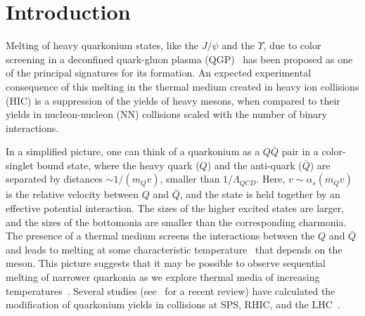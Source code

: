 \documentclass[article,showpacs,preprintnumbers,amsmath,amssymb]{revtex4}
\newcommand{\barQ}{{\bar{Q}}}
\begin{document}
\maketitle
\section{Introduction~\label{section:Introduction}}
Melting of heavy quarkonium states, like the $J/\psi$ and the
$\Upsilon$, due to color screening in a deconfined quark-gluon plasma 
(QGP)~\cite{Matsui:1986} has been proposed as one of the principal 
signatures for its  formation. An expected experimental consequence of this 
melting  in the thermal medium created in heavy ion collisions (HIC) is a
suppression of the yields of heavy mesons, when compared to their yields in
nucleon-nucleon (NN) collisions scaled with the number of binary 
interactions.  

In a simplified picture, one can think of a quarkonium as a $Q\barQ$ pair
in a color-singlet bound state, where the heavy quark ($Q$) and the
anti-quark ($\bar{Q}$) are separated by distances $\sim 1/(m_Qv)$,
smaller than $1/\Lambda_{QCD}$. Here, $v\sim \alpha_s(m_Q v)$ is the relative
velocity between $Q$ and $\barQ$, and the state is held together by an
effective potential interaction. The sizes of the higher excited states are
larger, and the sizes of the bottomonia are smaller than
the corresponding charmonia. The presence of a thermal medium screens the
interactions between the $Q$ and $\barQ$ and leads to melting at some
characteristic temperature~\cite{Mocsy:2007jz} that depends on
the meson. This picture suggests that it may be possible to observe sequential
melting of narrower quarkonia as we explore thermal media of increasing
temperatures~\cite{Karsch:1991,Karsch:2006}. Several studies
(see~\cite{ConesadelValle:2011fw} for a recent review) have calculated
the modification of quarkonium yields in collisions at SPS, RHIC, and the
LHC~\cite{Zhao:2008vu,Lourenco:2009,Rapp:2009my,
Strickland:LongAndShort,Margotta:2011ta,Song:2011nu}.
\end{document}
